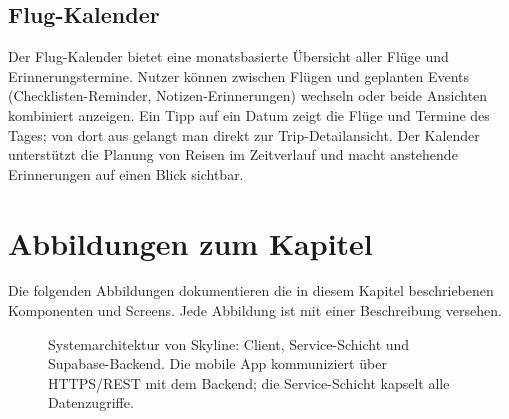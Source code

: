 \subsection{Flug-Kalender}

Der Flug-Kalender bietet eine monatsbasierte Übersicht aller Flüge und
Erinnerungstermine. Nutzer können zwischen Flügen und geplanten Events
(Checklisten-Reminder, Notizen-Erinnerungen) wechseln oder beide Ansichten
kombiniert anzeigen. Ein Tipp auf ein Datum zeigt die Flüge und Termine des
Tages; von dort aus gelangt man direkt zur Trip-Detailansicht. Der Kalender
unterstützt die Planung von Reisen im Zeitverlauf und macht anstehende
Erinnerungen auf einen Blick sichtbar.

\section{Abbildungen zum Kapitel}\label{sec:abbildungen-kapitel4}

Die folgenden Abbildungen dokumentieren die in diesem Kapitel beschriebenen
Komponenten und Screens. Jede Abbildung ist mit einer Beschreibung versehen.

\clearpage
\begin{figure}[H]
  \centering
  \vspace{2em}
  \vspace{1em}
  \caption{Systemarchitektur von Skyline: Client, Service-Schicht und Supabase-Backend. Die mobile App kommuniziert über HTTPS/REST mit dem Backend; die Service-Schicht kapselt alle Datenzugriffe.}
  \label{fig:architektur}
\end{figure}

